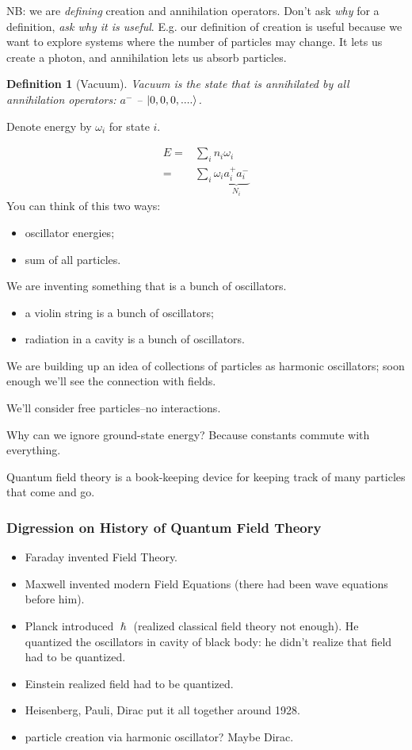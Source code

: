 \documentclass[]{article}
\newtheorem{defn}[thm]{Definition}
\begin{document}
NB: we are \emph{defining} creation and annihilation operators. Don't ask \emph{why} for a definition, \emph{ask why it is useful}. E.g. our definition of creation is useful because we want to explore systems where the number of particles may change. It lets us create a photon, and annihilation lets us absorb particles.

\begin{defn}[Vacuum]
	Vacuum is the state that is annihilated by all annihilation operators: $a^-$ -- $\ket{0,0,0,....}$.
\end{defn}

Denote energy by $\omega_i$ for state $i$. 

\begin{align*}
	E =& \sum_{i} n_i \omega_i\\
	=& \sum_{i} \omega_i \underbrace{ a^+_i a^-_i}_\text{$N_i$} 
\end{align*}
You can think of this two ways:
\begin{itemize}
	\item oscillator energies;
	\item sum of all particles.
\end{itemize}

We are inventing something that is a bunch of oscillators.
\begin{itemize}
	\item a violin string is a bunch of oscillators;
	\item radiation in a cavity is a bunch of oscillators.
\end{itemize}
We are building up an idea of collections of particles as harmonic oscillators; soon enough we'll see the connection with fields.

We'll consider free particles--no interactions.

Why can we ignore ground-state energy? Because constants commute with everything. 

Quantum field theory is a book-keeping device for keeping track of many particles that come and go.

\subsubsection{Digression on History of  Quantum Field Theory }
\begin{itemize}
	\item Faraday invented Field Theory.
	\item Maxwell invented modern Field Equations (there had been wave equations before him).
	\item Planck introduced $\hslash$ (realized classical field theory not enough). He quantized the oscillators in cavity of black body: he didn't realize that field had to be quantized.
	\item Einstein realized field had to be quantized.
	\item Heisenberg, Pauli, Dirac put it all together around 1928.
	\item particle creation via harmonic oscillator? Maybe Dirac.
\end{itemize}
\end{document}
